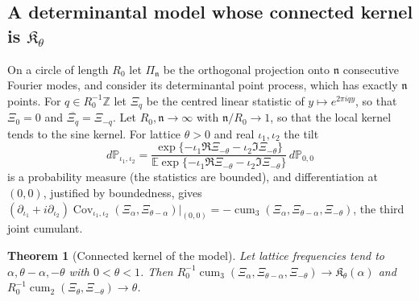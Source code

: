 \documentclass[preprint,12pt]{elsarticle}
\numberwithin{equation}{section}
\theoremstyle{plain}
\newtheorem{theorem}{Theorem}[section]
\theoremstyle{definition}
\theoremstyle{remark}
\begin{document}
\subsection{A determinantal model whose connected kernel is $\mathfrak K_\theta$}
\label{subsec:det_model}
On a circle of length $R_0$ let $\Pi_{\mathfrak n}$ be the orthogonal projection onto $\mathfrak n$ consecutive Fourier modes, and consider its determinantal point process, which has exactly $\mathfrak n$ points. For $q\in R_0^{-1}\mathbb Z$ let $\Xi_q$ be the centred linear statistic of $y\mapsto e^{2\pi iqy}$, so that $\Xi_0=0$ and $\overline{\Xi_q}=\Xi_{-q}$. Let $R_0,\mathfrak n\to\infty$ with $\mathfrak n/R_0\to1$, so that the local kernel tends to the sine kernel. For lattice $\theta>0$ and real $\iota_1,\iota_2$ the tilt
\begin{equation}
d\mathbb P_{\iota_1,\iota_2}=\frac{\exp\{-\iota_1\Re\Xi_{-\theta}-\iota_2\Im\Xi_{-\theta}\}}{\mathbb E\exp\{-\iota_1\Re\Xi_{-\theta}-\iota_2\Im\Xi_{-\theta}\}}\,d\mathbb P_{0,0}
\label{eq:real_tilt}
\end{equation}
is a probability measure (the statistics are bounded), and differentiation at $(0,0)$, justified by boundedness, gives $(\partial_{\iota_1}+i\partial_{\iota_2})\operatorname{Cov}_{\iota_1,\iota_2}(\Xi_\alpha,\Xi_{\theta-\alpha})|_{(0,0)}=-\operatorname{cum}_3(\Xi_\alpha,\Xi_{\theta-\alpha},\Xi_{-\theta})$, the third joint cumulant.

\begin{theorem}[Connected kernel of the model]\label{thm:sine_kernel}
Let lattice frequencies tend to $\alpha,\theta-\alpha,-\theta$ with $0<\theta<1$. Then $R_0^{-1}\operatorname{cum}_3(\Xi_\alpha,\Xi_{\theta-\alpha},\Xi_{-\theta})\to\mathfrak K_\theta(\alpha)$ and $R_0^{-1}\operatorname{cum}_2(\Xi_\theta,\Xi_{-\theta})\to\theta$.
\end{theorem}
\end{document}
